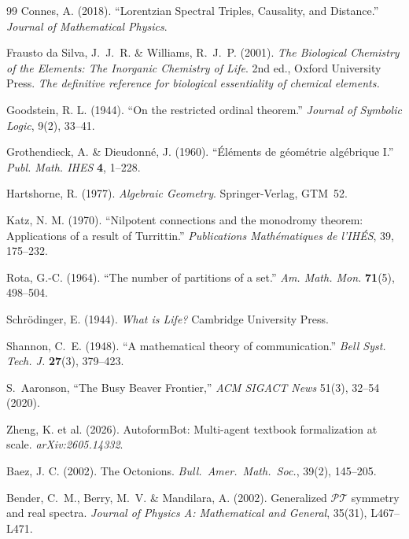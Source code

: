 \documentclass[12pt,oneside]{book}
\begin{document}
\vspace{2em}
\begin{thebibliography}{99}
Connes, A. (2018).
``Lorentzian Spectral Triples, Causality, and Distance.''
\textit{Journal of Mathematical Physics}.

Frausto da Silva, J.~J.~R. \& Williams, R.~J.~P. (2001).
\textit{The Biological Chemistry of the Elements: The Inorganic Chemistry of Life}.
2nd ed., Oxford University Press.
\textit{The definitive reference for biological essentiality of chemical elements.}

Goodstein, R. L. (1944).
``On the restricted ordinal theorem.''
\textit{Journal of Symbolic Logic}, 9(2), 33--41.

Grothendieck, A. \& Dieudonn\'e, J. (1960).
``\'El\'ements de g\'eom\'etrie alg\'ebrique I.''
\textit{Publ. Math. IHES} \textbf{4}, 1--228.

Hartshorne, R. (1977).
\textit{Algebraic Geometry}. Springer-Verlag, GTM~52.

Katz, N. M. (1970).
``Nilpotent connections and the monodromy theorem: Applications of a result of Turrittin.''
\textit{Publications Mathématiques de l'IHÉS}, 39, 175--232.

Rota, G.-C. (1964).
``The number of partitions of a set.''
\textit{Am. Math. Mon.} \textbf{71}(5), 498--504.

Schr\"odinger, E. (1944).
\textit{What is Life?} Cambridge University Press.

Shannon, C.~E. (1948).
``A mathematical theory of communication.''
\textit{Bell Syst. Tech. J.} \textbf{27}(3), 379--423.

S.~Aaronson,
``The Busy Beaver Frontier,''
\emph{ACM SIGACT News} 51(3), 32--54 (2020).

Zheng, K. et al. (2026). AutoformBot: Multi-agent textbook formalization at scale. \emph{arXiv:2605.14332}.

Baez, J. C. (2002). The Octonions. \emph{Bull.\ Amer.\ Math.\ Soc.}, 39(2), 145--205.

Bender, C.~M., Berry, M.~V. \& Mandilara, A. (2002).
Generalized $\mathcal{PT}$ symmetry and real spectra.
\emph{Journal of Physics A: Mathematical and General}, 35(31), L467--L471.


\end{thebibliography}
\end{document}
